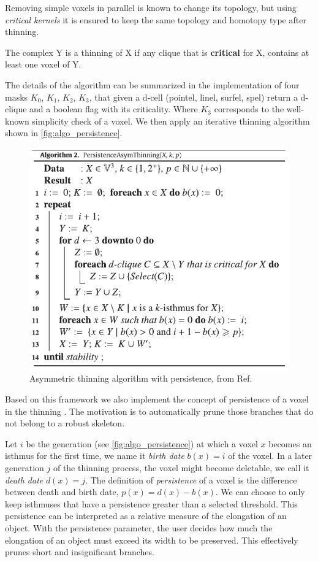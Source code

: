 Removing simple voxels in parallel is known to change its topology, but using \textit{critical kernels} it is ensured to keep the same topology and homotopy type after thinning.

\begin{theorem}
  The complex Y is a thinning of X if any clique that is \textbf{critical} for X,
  contains at least one voxel of Y.
\end{theorem}

The details of the algorithm can be summarized in the implementation of four masks
$K_0$, $K_1$, $K_2$, $ K_3$, that given a d-cell (pointel, linel, surfel, spel) return a d-clique and a boolean flag with its criticality. Where $K_3$ corresponds to the well-known simplicity check of a voxel. We then apply an iterative thinning algorithm shown in \autoref{fig:algo_persistence}.

\begin{figure}[!htb]
  \centering
  \includegraphics[width=0.8\linewidth]{Figures/chapter-image/dgtal/voxelComplexAlgoPersistence.png}
  \caption{Asymmetric thinning algorithm with persistence, from Ref.~\cite{couprie_asymmetric_2016}}
  \label{fig:algo_persistence}
\end{figure}

Based on this framework we also implement the concept of persistence of a voxel in the thinning \cite{couprie_asymmetric_2016}. The motivation is to automatically prune those branches that do not belong to a robust skeleton.

Let $i$ be the generation (see \autoref{fig:algo_persistence}) at which a voxel $x$ becomes an isthmus for the first time, we name it \textit{birth date} $b(x) = i$ of the voxel. In a later generation $j$ of the thinning process, the voxel might become deletable, we call it \textit{death date} $d(x) = j$.
The definition of \textit{persistence} of a voxel is the difference between death and birth date, $p(x) = d(x) - b(x)$.
We can choose to only keep isthmuses that have a persistence greater than a selected threshold. This persistence can be interpreted as a relative measure of the elongation of an object. With the persistence parameter, the user decides how much the elongation of an object must exceed its width to be preserved. This effectively prunes short and insignificant branches.

